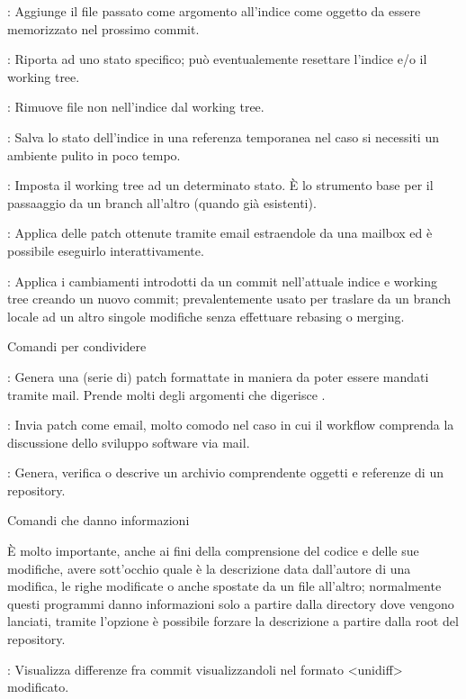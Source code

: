 \elemento{}: Aggiunge il file passato come argomento all'indice come
oggetto da essere memorizzato nel prossimo commit.

\elemento{}: Riporta  ad uno stato specifico; pu\`o
eventualemente resettare l'indice e/o il working tree.

\elemento{}: Rimuove file non nell'indice dal working tree.

\elemento{}: Salva lo stato dell'indice in una referenza temporanea
nel caso si necessiti un ambiente pulito in poco tempo.

\elemento{}: Imposta il working tree ad un determinato stato. \`E
lo strumento base per il passaaggio da un branch all'altro (quando gi\`a
esistenti).

\elemento{}: Applica delle patch ottenute tramite email estraendole da
una mailbox ed \`e possibile eseguirlo interattivamente.

\elemento{}: Applica i cambiamenti introdotti da un commit
nell'attuale indice e working tree creando un nuovo commit; prevalentemente
usato per traslare da un branch locale ad un altro singole modifiche senza
effettuare rebasing o merging.

\sezione Comandi per condividere

\elemento{}: Genera una (serie di) patch formattate in
maniera da poter essere mandati tramite mail. Prende molti degli argomenti che
digerisce .

\elemento{}: Invia patch come email, molto comodo nel caso in cui
il workflow comprenda la discussione dello sviluppo software via mail.

\elemento{}: Genera, verifica o descrive un archivio comprendente
oggetti e referenze di un repository.

\sezione Comandi che danno informazioni

\`E molto importante, anche ai fini della comprensione del codice e delle sue
modifiche, avere sott'occhio quale \`e la descrizione data dall'autore di una
modifica, le righe modificate o anche spostate da un file all'altro; normalmente
questi programmi danno informazioni solo a partire dalla directory dove vengono
lanciati, tramite l'opzione  \`e possibile forzare la
descrizione a partire dalla root del repository.

\elemento{}: Visualizza differenze fra commit visualizzandoli nel
formato \evidenzia<unidiff>
modificato.

